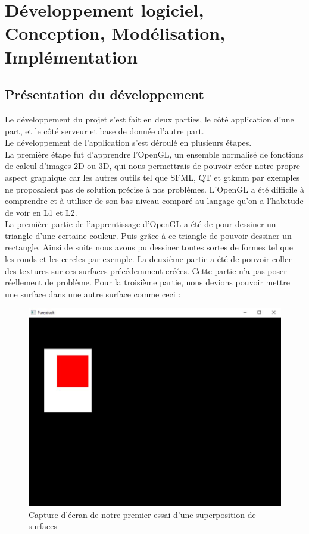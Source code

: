 \documentclass{report}
\begin{document}
\chapter{Développement logiciel, Conception, Modélisation, Implémentation}
\section{Présentation du développement}
Le développement du projet s'est fait en deux parties, le côté application d'une part, et le côté serveur et base de donnée d'autre part. \\

Le développement de l'application s'est déroulé en plusieurs étapes. \\
La première étape fut d'apprendre l'OpenGL, un ensemble normalisé de fonctions de calcul d'images 2D ou 3D, qui nous permettrais de pouvoir créer notre propre aspect graphique car les autres outils tel que SFML, QT et gtkmm par exemples ne proposaient pas de solution précise à nos problèmes.
L'OpenGL a été difficile  à comprendre et à utiliser de son bas niveau comparé au langage qu'on a l'habitude de voir en L1 et L2. \\
La première partie de l'apprentissage d'OpenGL a été de pour dessiner un triangle d'une certaine couleur. Puis grâce à ce triangle de pouvoir dessiner un rectangle. Ainsi de suite nous avons pu dessiner toutes sortes de formes tel que les ronds et les cercles par exemple.
La deuxième partie a été de pouvoir coller des textures sur ces surfaces précédemment créées. Cette partie n'a pas poser réellement de problème.
Pour la troisième partie, nous devions pouvoir mettre une surface dans une autre surface comme ceci :
\vspace{1cm}
\begin{figure}[!h]
    \begin{center}
        \includegraphics[scale=0.3]{exempleSurface.jpg}
        \caption{Capture d'écran de notre premier essai d'une superposition de surfaces}
    \end{center}
\end{figure}
\end{document}
